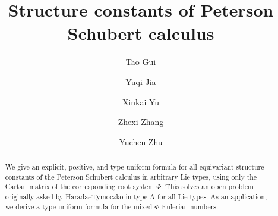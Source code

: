 \documentclass[11pt, letterpaper]{amsart}
\numberwithin{equation}{section}
\begin{document}
\title[Structure constants of Peterson Schubert calculus
]{Structure constants of Peterson Schubert calculus
}



\author{Tao Gui}
\address{(Tao Gui) \newline \indent Beijing International Center for Mathematical Research, Peking University, No.\ 5 Yiheyuan Road, Haidian District, Beijing 100871, P.R. China}

\author{Yuqi Jia}
\address{(Yuqi Jia) \newline \indent Qiuzhen College, Tsinghua University, Beijing, China}

\author{Xinkai Yu}
\address{(Xinkai Yu) \newline \indent University of Science and Technology of China, 96 Jinzhai Road, Baohe District, Hefei, Anhui Province 230026, P.R. China}

\author{Zhexi Zhang}
\address{(Zhexi Zhang) \newline \indent Department of Mathematics, Southern University of Science and Technology, 1088 Xueyuan Boulevard, Nanshan District, Shenzhen, Guangdong Province 518055, P.R. China}

\author{Yuchen Zhu}
\address{(Yuchen Zhu) \newline \indent Center for combinatorics, Nankai University, No.\ 94 Weijin Road, Nankai District, Tianjin 300071, P.R.China}

\begin{abstract}
We give an explicit, positive, and type-uniform formula for all equivariant structure constants of the Peterson Schubert calculus in arbitrary Lie types, using only the Cartan matrix of the corresponding root system $\Phi$. This solves an open problem originally asked by Harada--Tymoczko in type A for all Lie types. As an application, we derive a type-uniform formula for the mixed $\Phi$-Eulerian numbers. 
\end{abstract}

\maketitle
\end{document}
